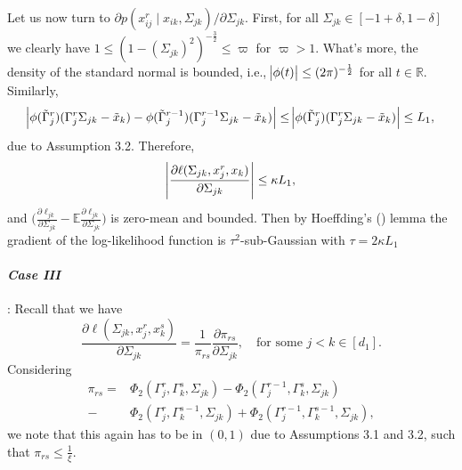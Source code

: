 \begin{condition}
    Let us now turn to $\partial p(x_{ij}^{r} \mid x_{ik}, \Sigma_{jk})/\partial \Sigma_{jk}$. First, for all $\Sigma_{jk} \in [-1+\delta, 1-\delta]$ we clearly have $1 \leq (1-(\Sigma_{jk})^2)^{-\frac{3}{2}} \leq \varpi$ for $\varpi > 1$. What's more, the density of the standard normal is bounded, i.e., $\abs{\phi(t)} \leq (2\pi)^{-\frac{1}{2}}$ for all $t \in \mathbb{R}$. Similarly,
    \begin{equation*}
        \abs{\phi({\tilde{\Gamma}}_j^{r})({\Gamma}_j^r\Sigma_{jk} - {\tilde{x}}_{k}) - \phi({\tilde{\Gamma}}_j^{r-1})({\Gamma}_j^{r-1}\Sigma_{jk} - {\tilde{x}}_{k})} \leq  \abs{\phi({\tilde{\Gamma}}_j^{r})({\Gamma}_j^r\Sigma_{jk} - {\tilde{x}}_{k})} \leq L_1,
    \end{equation*}
    due to Assumption 3.2. %
    Therefore,
    \begin{equation*}
        \abs{\frac{\partial\ell(\Sigma_{jk}, x_j^r,x_k)}{\partial \Sigma_{jk}}} \leq \kappa L_1,
    \end{equation*}
    and $\Big(\frac{\partial\ell_{jk}}{\partial \Sigma_{jk}} - \mathbb{E}\frac{\partial\ell_{jk}}{\partial \Sigma_{jk}} \Big)$ is zero-mean and bounded. Then by Hoeffding's (\citeyear{Hoeffding63}) lemma  the gradient of the log-likelihood function is $\tau^2$-sub-Gaussian with $\tau = 2\kappa L_1$

    \paragraph{\textit{Case III}}: Recall that we have
    \begin{equation*}
        \frac{\partial \ell(\Sigma_{jk}, x_j^r,x_k^s)}{\partial \Sigma_{jk}} = \frac{1}{\pi_{rs}} \frac{\partial \pi_{rs}}{\partial \Sigma_{jk}}, \quad \text{for some }j<k \in [d_1].
    \end{equation*}
    Considering
    \begin{align*}
        \pi_{rs} = &\Phi_2({\Gamma}_j^r, {\Gamma}_k^s, \Sigma_{jk}) - \Phi_2({\Gamma}_j^{r-1}, {\Gamma}_k^s, \Sigma_{jk}) \\
        - &\Phi_2({\Gamma}_j^r, {\Gamma}_k^{s-1}, \Sigma_{jk}) + \Phi_2({\Gamma}_j^{r-1}, {\Gamma}_k^{s-1}, \Sigma_{jk}),
    \end{align*}
    we note that this again has to be in $(0,1)$ due to Assumptions 3.1 and 3.2,
    such that $\pi_{rs} \leq \frac{1}{\xi}$. %


\end{condition}
